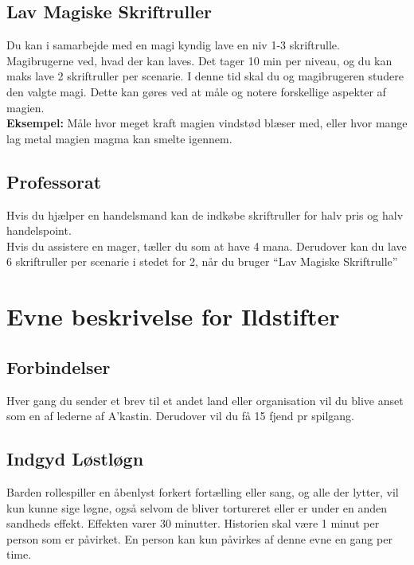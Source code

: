 \subsection*{Lav Magiske Skriftruller}
Du kan i samarbejde med en magi kyndig lave en niv 1-3 skriftrulle. Magibrugerne ved, hvad der kan laves. Det tager 10 min per niveau, og du kan maks lave 2 skriftruller per scenarie. I denne tid skal du og magibrugeren studere den valgte magi. Dette kan gøres ved at måle og notere forskellige aspekter af magien.\\ \textbf{Eksempel:} Måle hvor meget kraft magien vindstød blæser med, eller hvor mange lag metal magien magma kan smelte igennem.

\subsection*{Professorat}
Hvis du hjælper en handelsmand kan de indkøbe skriftruller for halv pris og halv handelspoint.\\
Hvis du assistere en mager, tæller du som at have 4 mana.
Derudover kan du lave 6 skriftruller per scenarie i stedet for 2, når du bruger “Lav Magiske Skriftrulle”


\section*{Evne beskrivelse for Ildstifter}

\subsection*{Forbindelser}
Hver gang du sender et brev til et andet land eller organisation vil du blive anset
som en af lederne af A’kastin. Derudover vil du få 15 fjend pr spilgang.

\subsection*{Indgyd Løstløgn}
Barden rollespiller en åbenlyst forkert fortælling eller sang, og alle der lytter, vil kun kunne sige løgne, også selvom de bliver tortureret eller er under en anden sandheds effekt. Effekten varer 30 minutter. Historien skal være 1 minut per person som er påvirket. En person kan kun påvirkes af denne evne en gang per time.


